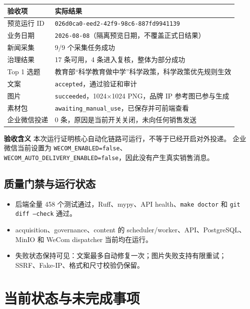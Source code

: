 \documentclass[UTF8,11pt,a4paper,fontset=none]{ctexart}
\begin{document}
\noindent\begin{tabularx}{\textwidth}{L{4.0cm}Y}
\toprule
{}
\color{white}\bfseries\sffamily 验收项 & \color{white}\bfseries\sffamily 实际结果 \\
\midrule
预览运行 ID & \texttt{026d0ca0-eed2-42f9-98c6-887fd9941139} \\
业务日期 & \texttt{2026-08-08}（隔离预览日期，不覆盖正式日结果） \\
新闻采集 & 9/9 个采集任务成功 \\
治理结果 & 17 条可用，4 条进入复核，整体为部分成功 \\
Top 1 选题 & 教育部“科学教育做中学”科学政策，科学政策优先规则生效 \\
文案 & \texttt{accepted}，通过验证和审计 \\
图片 & \texttt{succeeded}，1024×1024 PNG，品牌 IP 参考图已参与生成 \\
素材包 & \texttt{awaiting\_manual\_use}，已保存并可前端查看 \\
企业微信投递 & 0 条，原因是当前开关关闭，未向任何销售发送 \\
\bottomrule
\end{tabularx}

\begin{infobox}
\textbf{\sffamily\color{navy}验收含义}\quad
本次运行证明核心自动化链路可运行，不等于已经开启对外投递。
企业微信当前设置为 \texttt{WECOM\_ENABLED=false}、
\texttt{WECOM\_AUTO\_DELIVERY\_ENABLED=false}，因此没有产生真实销售消息。
\end{infobox}

\subsection{质量门禁与运行状态}

\begin{itemize}[leftmargin=2em,itemsep=0.2em]
  \item 后端全量 458 个测试通过，Ruff、mypy、API health、\texttt{make doctor} 和 \texttt{git diff --check} 通过。
  \item acquisition、governance、content 的 scheduler/worker、API、PostgreSQL、MinIO 和 WeCom dispatcher 当前均在运行。
  \item 失败状态保持可见：文案最多自动修复一次；图片失败支持有限重试；SSRF、Fake-IP、格式和尺寸校验仍保留。
\end{itemize}

\section{当前状态与未完成事项}
\end{document}
